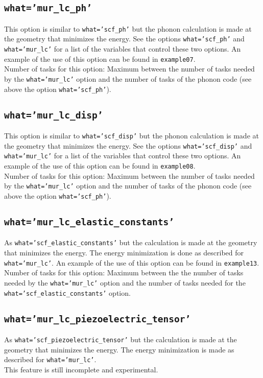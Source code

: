 \documentclass[12pt,a4paper]{article}
\begin{document}
\subsection{\texttt{what='mur\_lc\_ph'}}
This option is similar to \texttt{what='scf\_ph'} but the phonon calculation
is made at the geometry that minimizes the energy.
See the options \texttt{what='scf\_ph'} and \texttt{what='mur\_lc'} for a
list of the variables that control these two options. 
An example of the use of this option can be found in \texttt{example07}. \\
Number of tasks for this option: Maximum between the number of tasks 
needed by the \texttt{what='mur\_lc'} option and the number
of tasks of the phonon code (see above the option \texttt{what='scf\_ph'}).

\subsection{\texttt{what='mur\_lc\_disp'}}
This option is similar to \texttt{what='scf\_disp'} but the phonon calculation
is made at the geometry that minimizes the energy.
See the options \texttt{what='scf\_disp'} and \texttt{what='mur\_lc'} for a
list of the variables that control these two options. 
An example of the use of this option can be found in \texttt{example08}. \\
Number of tasks for this option: Maximum between the number of tasks  
needed by the \texttt{what='mur\_lc'} option and the number
of tasks of the phonon code (see above the option \texttt{what='scf\_ph'}).

\subsection{\texttt{what='mur\_lc\_elastic\_constants'}}
As \texttt{what='scf\_elastic\_constants'} but the calculation is made at the
geometry that minimizes the energy. The energy minimization is 
done as described for \texttt{what='mur\_lc'}. An example of the use of this 
option can be found in \texttt{example13}. \\
Number of tasks for this option: Maximum between the the number of tasks
needed by the \texttt{what='mur\_lc'} option and the number of tasks
needed for the \texttt{what='scf\_elastic\_constants'} option.

\subsection{\texttt{what='mur\_lc\_piezoelectric\_tensor'}}
As \texttt{what='scf\_piezoelectric\_tensor'} but the calculation is made at the
geometry that minimizes the energy. The
energy minimization is made as described for \texttt{what='mur\_lc'}. \\
This feature is still incomplete and experimental.
\end{document}
